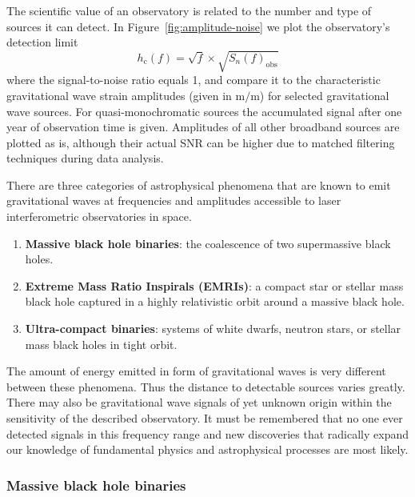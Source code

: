 \documentclass[fleqn,10pt]{<approot>/designer/latexelements/SelfArx} %
\begin{document}
The scientific value of an observatory is related to the number and type of sources it can detect. In Figure~\ref{fig:amplitude-noise} we plot the
observatory's detection limit
\begin{equation}
h_\text{c}\left(f\right) = \sqrt{f} \times \sqrt{S_n\left(f\right)_\text{obs}}
\label{eq:transferfunctionobs}
\end{equation}
where the signal-to-noise ratio equals 1, and compare it to the characteristic gravitational wave strain amplitudes (given in $\text{m}/\text{m}$) for selected gravitational wave sources. For quasi-monochromatic sources the accumulated signal after one year of observation time is given. Amplitudes of all other broadband sources are plotted as is, although their actual SNR can be higher due to matched filtering techniques during data analysis.

There are three categories of astrophysical phenomena that are known to emit gravitational waves at frequencies and amplitudes accessible to laser interferometric observatories in space.

\begin{enumerate}[noitemsep] %
\item \textbf{Massive black hole binaries}: the coalescence of two supermassive black holes.
\item \textbf{Extreme Mass Ratio Inspirals (EMRIs)}: a compact star or stellar mass black hole captured in a highly relativistic orbit around a massive black hole.
\item \textbf{Ultra-compact binaries}: systems of white dwarfs, neutron stars, or stellar mass black holes in tight orbit.
\end{enumerate}

The amount of energy emitted in form of gravitational waves is very different between these phenomena. Thus the distance to detectable sources varies greatly.\\

There may also be gravitational wave signals of yet unknown origin within the sensitivity of the described observatory. It must be remembered that no one ever detected signals in this frequency range and new discoveries that radically expand our knowledge of fundamental physics and astrophysical processes are most likely.

\subsubsection{Massive black hole binaries}
\end{document}
